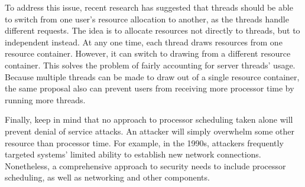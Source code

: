 To address this issue, recent research has suggested that threads
should be able to switch from one user's resource allocation to
another, as the threads handle different requests.  The idea is to
allocate resources not directly to threads, but to independent
 instead.  At any one time, each thread draws resources
from one resource container.  However, it can switch to drawing from a
different resource container.  This solves the problem of fairly
accounting for server threads' usage. Because multiple threads can be
made to draw out of a single resource container, the same proposal
also can prevent users from receiving more processor time by running
more threads.

Finally, keep in mind that no approach to processor scheduling taken
alone will prevent denial of service attacks.  An attacker will simply
overwhelm some other resource than processor time.  For example, in
the 1990s, attackers frequently targeted systems' limited ability to
establish new network connections.  Nonetheless, a comprehensive
approach to security needs to include processor scheduling, as well as
networking and other components.

